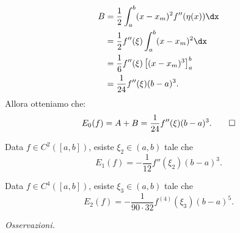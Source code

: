 \begin{align*}
B & =\frac{1}{2}\int\nolimits ^{b}_{a}( x-x_{m})^{2} f''( \eta (x)) \dx\\
 & =\frac{1}{2} f''( \xi )\int\nolimits ^{b}_{a}( x-x_{m})^{2} \dx\\
 & =\frac{1}{6} f''( \xi )\left[( x-x_{m})^{3}\right]^{b}_{a}\\
 & =\frac{1}{24} f''( \xi )( b-a)^{3}.
\end{align*}
Allora otteniamo che:
\begin{gather*}
E_{0}(f) =A+B=\frac{1}{24} f''( \xi )( b-a)^{3}.
\qed
\end{gather*}
\begin{theorem}
Data $f\in C^{2}([ a,b])$, esiste $\xi _{2} \in ( a,b)$ tale che
\begin{equation*}
E_{1}(f) =-\frac{1}{12} f''( \xi _{2})( b-a)^{3}.
\end{equation*}
\end{theorem}
\begin{theorem}
Data $f\in C^{4}([ a,b])$, esiste $\xi _{3} \in ( a,b)$ tale che
\begin{equation*}
E_{2}(f) =-\frac{1}{90 \cdot 32} f^{(4)}( \xi _{3})( b-a)^{5}.
\end{equation*}
\end{theorem}
\textit{Osservazioni.}
